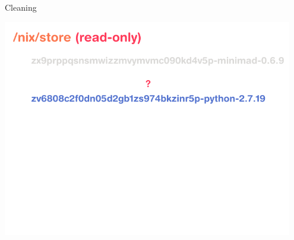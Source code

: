 \documentclass[a4paper]{beamer}
\begin{document}
\begin{frame}{Cleaning}
{\begin{center}
        \end{center}
    }
     {
        \begin{center}
            \includegraphics[width=0.95\textwidth]{img/schema-nix-store-cleaning-4.pdf}
        \end{center}
     }


\end{frame}
\end{document}
